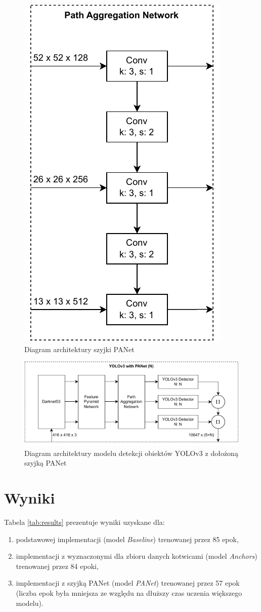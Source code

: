 \documentclass{article}
\begin{document}
\begin{figure}[!h]
    \centering \includegraphics[width=0.35\linewidth]{panet}
    \caption{Diagram architektury szyjki PANet}
    \label{fig:panet}
\end{figure}

\begin{figure}[!h]
    \centering \includegraphics[width=0.7\linewidth]{yolov3-panet}
    \caption{Diagram architektury modelu detekcji obiektów YOLOv3 z dołożoną szyjką PANet}
    \label{fig:yolov3_panet}
\end{figure}

\FloatBarrier

\section{Wyniki}

Tabela \ref{tab:results} prezentuje wyniki uzyskane dla:

\begin{enumerate}
    \item podstawowej implementacji (model \textit{Baseline}) trenowanej przez 85 epok,
    \item implementacji z wyznaczonymi dla zbioru danych kotwicami (model \textit{Anchors}) trenowanej przez 84 epoki,
    \item implementacji z szyjką PANet (model \textit{PANet}) trenowanej przez 57 epok (liczba epok była mniejsza ze względu na dłuższy czas uczenia większego modelu).
\end{enumerate}
\end{document}
